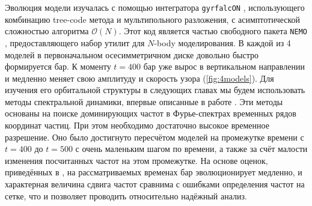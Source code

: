 \documentclass{trlnotes}
\begin{document}
Эволюция модели изучалась с помощью интегратора \texttt{gyrfalcON} \cite{dehnen2002}, использующего комбинацию
tree-code метода и мультипольного разложения, с асимптотической сложностью алгоритма $\mathcal O(N)$. Этот код 
является частью свободного пакета \texttt{NEMO} \citep{teuben1995a}, предоставляющего набор утилит для $N$-body 
моделирования. В каждой из 4 моделей в первоначальном осесимметричном диске довольно быстро формируется бар. К моменту $t=400$ бар уже вырос в вертикальном направлении и медленно меняет свою амплитуду и скорость узора (\ref{fig:4models}). Для изучения его орбитальной структуры в следующих главах мы будем использовать методы 
спектральной динамики, впервые описанные в работе \citet{binney1982}. Эти методы основаны на поиске доминирующих 
частот в Фурье-спектрах временных рядов координат частиц. При этом необходимо достаточно высокое временное 
разрешение. Оно было достигнуто пересчётом моделей на промежутке времени с $t=400$ до $t=500$ с очень маленьким 
шагом по времени, а также за счёт малости изменения посчитанных частот на этом промежутке. На основе оценок, 
приведённых в \cite{parul2020}, на рассматриваемых временах бар эволюционирует медленно, и характерная величина 
сдвига частот сравнима с ошибками определения частот на сетке, что и позволяет проводить относительно надёжный 
анализ.
\end{document}
